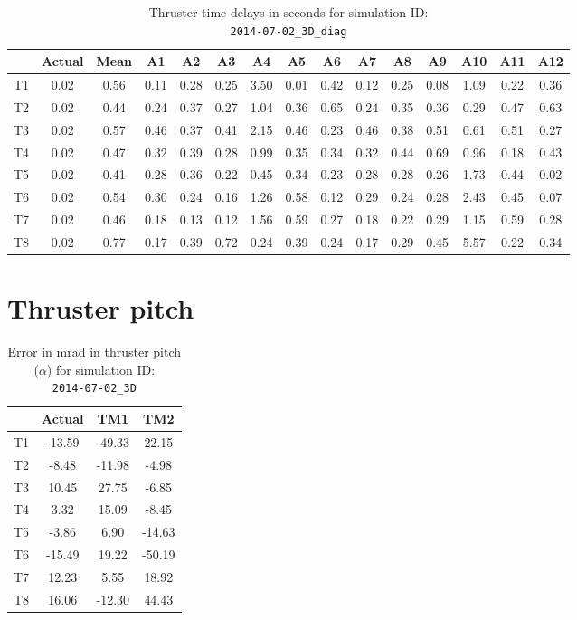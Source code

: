 \begin{table}[H]
\centering
\cprotect\caption{Thruster time delays in seconds for simulation ID:\\
\verb|2014-07-02_3D_diag|}
\begin{tabular}{|c|c|c|c|c|c|c|c|c|c|c|c|c|c|c|} \hline
~ & Actual & Mean & A1 & A2 & A3 & A4 & A5 & A6 & A7 & A8 & A9 & A10 & A11 & A12 \\ \hline
T1 & 0.02 & 0.56 & 0.11 & 0.28 & 0.25 & 3.50 & 0.01 & 0.42 & 0.12 & 0.25 & 0.08 & 1.09 & 0.22 & 0.36 \\
T2 & 0.02 & 0.44 & 0.24 & 0.37 & 0.27 & 1.04 & 0.36 & 0.65 & 0.24 & 0.35 & 0.36 & 0.29 & 0.47 & 0.63 \\
T3 & 0.02 & 0.57 & 0.46 & 0.37 & 0.41 & 2.15 & 0.46 & 0.23 & 0.46 & 0.38 & 0.51 & 0.61 & 0.51 & 0.27 \\
T4 & 0.02 & 0.47 & 0.32 & 0.39 & 0.28 & 0.99 & 0.35 & 0.34 & 0.32 & 0.44 & 0.69 & 0.96 & 0.18 & 0.43 \\
T5 & 0.02 & 0.41 & 0.28 & 0.36 & 0.22 & 0.45 & 0.34 & 0.23 & 0.28 & 0.28 & 0.26 & 1.73 & 0.44 & 0.02 \\
T6 & 0.02 & 0.54 & 0.30 & 0.24 & 0.16 & 1.26 & 0.58 & 0.12 & 0.29 & 0.24 & 0.28 & 2.43 & 0.45 & 0.07 \\
T7 & 0.02 & 0.46 & 0.18 & 0.13 & 0.12 & 1.56 & 0.59 & 0.27 & 0.18 & 0.22 & 0.29 & 1.15 & 0.59 & 0.28 \\
T8 & 0.02 & 0.77 & 0.17 & 0.39 & 0.72 & 0.24 & 0.39 & 0.24 & 0.17 & 0.29 & 0.45 & 5.57 & 0.22 & 0.34 \\ \hline
\end{tabular}
\label{delay-6}
\end{table}
\newpage
\section*{Thruster pitch}


\begin{table}[H]
\centering
\cprotect\caption{Error in mrad in thruster pitch ($\alpha$) for simulation ID:\\
\verb|2014-07-02_3D|}
\begin{tabular}{|c|c|c|c|} \hline
~ & Actual & TM1 & TM2 \\ \hline
T1 & -13.59 & -49.33 & 22.15 \\
T2 & -8.48 & -11.98 & -4.98 \\
T3 & 10.45 & 27.75 & -6.85 \\
T4 & 3.32 & 15.09 & -8.45 \\
T5 & -3.86 & 6.90 & -14.63 \\
T6 & -15.49 & 19.22 & -50.19 \\
T7 & 12.23 & 5.55 & 18.92 \\
T8 & 16.06 & -12.30 & 44.43 \\ \hline
\end{tabular}
\label{alpha-5}
\end{table}

